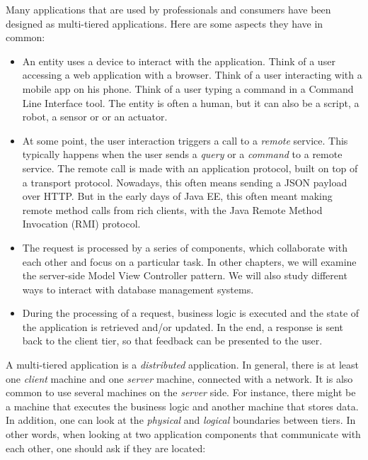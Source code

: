 
Many applications that are used by professionals and consumers have been designed as multi-tiered applications. Here are some aspects they have in common:

\begin{itemize}
\item An entity uses a device to interact with the application. Think of a user accessing a web application with a browser. Think of a user interacting with a mobile app on his phone. Think of a user typing a command in a Command Line Interface tool. The entity is often a human, but it can also be a script, a robot, a sensor or or an actuator.
\item At some point, the user interaction triggers a call to a \emph{remote} service. This typically happens when the user sends a \emph{query} or a \emph{command} to a remote service. The remote call is made with an application protocol, built on top of a transport protocol. Nowadays, this often means sending a JSON payload over HTTP. But in the early days of Java EE, this often meant making remote method calls from rich clients, with the Java Remote Method Invocation (RMI) protocol.
\item The request is processed by a series of components, which collaborate with each other and focus on a particular task. In other chapters, we will examine the server-side Model View Controller pattern. We will also study different ways to interact with database management systems.
\item During the processing of a request, business logic is executed and the state of the application is retrieved and/or updated. In the end, a response is sent back to the client tier, so that feedback can be presented to the user.
\end{itemize}

A multi-tiered application is a \emph{distributed} application. In general, there is at least one \emph{client} machine and one \emph{server} machine, connected with a network. It is also common to use several machines on the \emph{server} side. For instance, there might be a machine that executes the business logic and another machine that stores data. In addition, one can look at the \emph{physical} and \emph{logical} boundaries between tiers. In other words, when looking at two application components that communicate with each other, one should ask if they are located:

